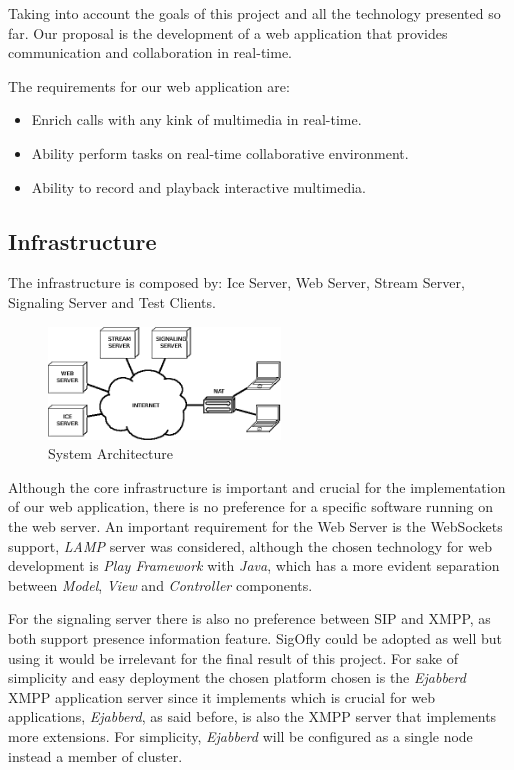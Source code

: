 Taking into account the goals of this project and all the technology presented so far. Our proposal is the development of a web application that provides communication and collaboration in real-time.

The requirements for our web application are:

\begin{itemize}
 \item Enrich calls with any kink of multimedia in real-time.
 \item Ability perform tasks on real-time collaborative environment.
 \item Ability to record and playback interactive multimedia.
\end{itemize}

\subsection{Infrastructure}

The infrastructure is composed by: Ice Server, Web Server, Stream Server, Signaling Server and Test Clients.

\begin{figure}[H]
	\centering
	\includegraphics[width=0.55\textwidth]{figures/arch.png}
	\caption{System Architecture}
\end{figure}

Although the core infrastructure is important and crucial for the implementation of our web application, there is no preference for a specific software running on the web server. An important requirement for the Web Server is the WebSockets support, \emph{LAMP} server was considered, although the chosen technology for web development is \emph{Play Framework} with \emph{Java}, which has a more evident separation between \emph{Model}, \emph{View} and \emph{Controller} components.

For the signaling server there is also no preference between \ac{SIP} and \ac{XMPP}, as both support presence information feature. \ac{SigOfly} could be adopted as well but using it would be irrelevant for the final result of this project. For sake of simplicity and easy deployment the chosen platform chosen is the \emph{Ejabberd} \ac{XMPP} application server since it implements \cite{xep0206} which is crucial for web applications, \emph{Ejabberd}, as said before, is also the \ac{XMPP} server that implements more extensions. For simplicity, \emph{Ejabberd} will be configured as a single node instead a member of cluster. 

